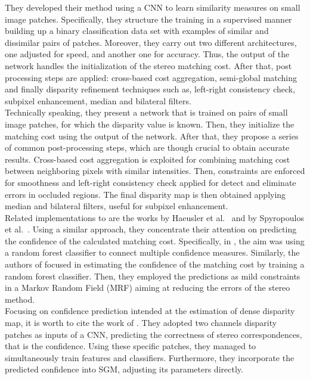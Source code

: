 They developed their method using a CNN to learn similarity measures on small image patches. 
Specifically, they structure the training in a supervised manner building up a binary classification data set with examples of similar and dissimilar pairs of patches. 
Moreover, they carry out two different architectures, one adjusted for speed, and another one for accuracy. 
Thus, the output of the network handles the initialization of the stereo matching cost. 
After that, post processing steps are applied: cross-based cost aggregation, semi-global matching and finally disparity refinement techniques such as, left-right consistency check, subpixel enhancement, median and bilateral filters.\\
Technically speaking, they present a network that is trained on pairs of small image patches, for which the disparity value is known. 
Then, they initialize the matching cost using the output of the network.
After that, they propose a series of common post-processing steps, which are though crucial to obtain accurate results.
Cross-based cost aggregation is exploited for combining matching cost between neighboring pixels with similar intensities. 
Then, constraints are enforced for smoothness and left-right consistency check applied for detect and eliminate errors in occluded regions. 
The final disparity map is then obtained applying median and bilateral filters, useful for subpixel enhancement. \\
Related implementations to \cite{Zbontar2016} are the works by Haeusler et al.~\cite{Haeusler2013} and by Spyropoulos et al.~\cite{Spyropoulos2014}. 
Using a similar approach, they concentrate their attention on predicting the confidence of the calculated matching cost. 
Specifically, in \cite{Haeusler2013}, the aim was using a random forest classifier to connect multiple confidence measures. 
Similarly, the authors of \cite{Spyropoulos2014} focused in estimating the confidence of the matching cost by training a random forest classifier. 
Then, they employed the predictions as mild constraints in a Markov Random Field (MRF) aiming at reducing the errors of the stereo method.\\
Focusing on confidence prediction intended at the estimation of dense disparity map, it is worth to cite the work of \cite{Seki2016}.
They adopted two channels disparity patches as inputs of a CNN, predicting the correctness of stereo correspondences, that is the confidence. 
Using these specific patches, they managed to simultaneously train features and classifiers.
Furthermore, they incorporate the predicted confidence into SGM, adjusting its parameters directly. \\
